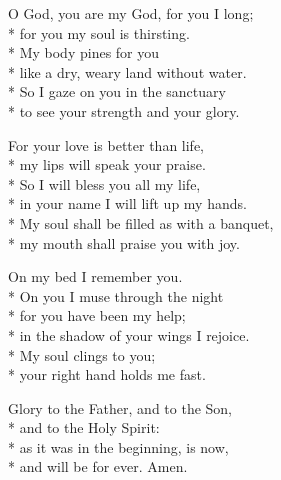  O God, you are my God, for you I long; \\*
 for you my soul is thirsting. \\*
My body pines for you \\*
like a dry, weary land without water. \\*
So I gaze on you in the sanctuary \\*
to see your strength and your glory.

 For your love is better than life, \\*
my lips will speak your praise. \\*
So I will bless you all my life, \\*
in your name I will lift up my hands. \\*
My soul shall be filled as with a banquet, \\*
my mouth shall praise you with joy.

 On my bed I remember you. \\*
On you I muse through the night \\*
for you have been my help; \\*
in the shadow of your wings I rejoice. \\*
My soul clings to you; \\*
your right hand holds me fast.

 Glory to the Father, and to the Son,  \\*
and to the Holy Spirit: \\*
 as it was in the beginning, is now,  \\*
and will be for ever. Amen.